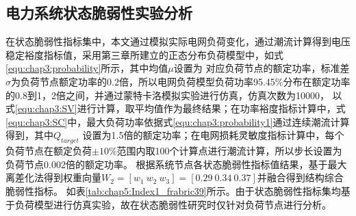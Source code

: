 \subsection{电力系统状态脆弱性实验分析}
\label{sec:singleAnalysis_status}
在状态脆弱性指标集中，本文通过模拟实际电网负荷变化，通过潮流计算得到电压稳定裕度指标值，采用第三章所建立的正态分布负荷模型中，如式\ref{equ:chap3:probability}所示，其中均值$\mu$设置为
对应负荷节点的额定功率，标准差$\sigma$为负荷节点额定功率的$0.2$倍，所以电网负荷模型负荷功率95.45$\%$分布在额定功率的0.8到1，2倍之间，并通过蒙特卡洛模拟实验进行仿真，仿真次数为10000，
以式\ref{equ:chap3:SV}进行计算，取平均值作为最终结果；在功率裕度指标计算中，式\ref{equ:chap3:SC}中，最大负荷功率依据式\ref{equ:chap3:probability1}通过连续潮流计算得到，其中$Q_{target}$
设置为1.5倍的额定功率；在电网损耗灵敏度指标计算中，每个负荷节点在额定负荷$\pm 10 \%$范围内取100个计算点进行潮流计算，所以步长设置为负荷节点0.002倍的额定功率。
根据系统节点各状态脆弱性指标值结果，基于最大离差化法得到权重向量$W_2 = \left[w_{1}\ w_{2}\ w_{3}\right]=[0.29\ 0.34\ 0.37]$并融合得到结构综合脆弱性指标。
如表\ref{tab:chap5:Index1_frabric39}所示。由于状态脆弱性指标集均基于负荷模型进行仿真实验，故在状态脆弱性研究时仅针对负荷节点进行分析。


